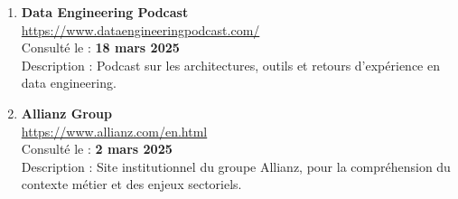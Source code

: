 \begin{enumerate}
    \item \textbf{Data Engineering Podcast} \\
    \url{https://www.dataengineeringpodcast.com/} \\
    Consulté le : \textbf{18 mars 2025} \\
    Description : Podcast sur les architectures, outils et retours d’expérience en data engineering.

    \item \textbf{Allianz Group} \\
    \url{https://www.allianz.com/en.html} \\
    Consulté le : \textbf{2 mars 2025} \\
    Description : Site institutionnel du groupe Allianz, pour la compréhension du contexte métier et des enjeux sectoriels.
\end{enumerate}

